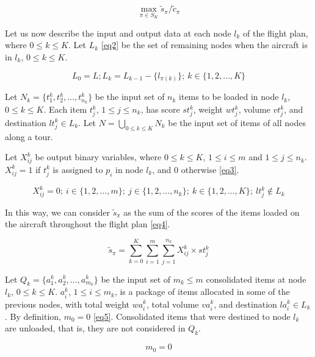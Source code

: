 \documentclass[preprint]{elsarticle}
\begin{document}
\begin{equation} \label{eq1}
	\max_{\pi \in S_K} \tilde{s}_\pi/\tilde{c}_\pi
\end{equation}

Let us now describe the input and output data at each node $l_k$\/ of the flight plan, where $0 \leq k \leq K$. Let $L_k$ \ref{eq2} be the set of remaining nodes when the aircraft is in $l_k$, $0 \leq k \leq K$.

\begin{equation} \label{eq2}
	L_0 = L; L_{k} = L_{k-1} - \{l_{\pi(k)}\}; \ k \in \{1, 2, \ldots, K\}
\end{equation}

Let $N_k = \{t^k_1, t^k_2, \ldots, t^k_{n_k} \}$ be the input set of $n_k$\/ items to be loaded in node $l_k$, $0 \leq k \leq K$. Each item $t^k_j$, $1 \leq j \leq n_k$, has score $st^k_j$, weight $wt^k_j$, volume $vt^k_j$, and destination $lt^k_j \in L_k$. Let $N = \bigcup_{0 \leq k \leq K} N_k$\/ be the input set of items of all nodes along a tour.

Let $X_{ij}^k$\/ be output binary variables, where $0 \leq k \leq K$, $1 \leq i \leq m$\/ and $1 \leq j \leq n_k$. $X_{ij}^k = 1$\/ if $t_j^k$\/ is assigned to $p_i$\/ in node $l_k$, and 0 otherwise \ref{eq3}. 

\begin{equation} \label{eq3}
	X_{ij}^k = 0;  \ i \in \{1, 2, \ldots, m\}; \ j \in \{1, 2, \ldots, n_k\}; \ k \in \{1,2, \ldots, K\}; \ lt_j^k \notin L_k
\end{equation}

In this way, we can consider $\tilde{s}_\pi$ as the sum of the scores of the items loaded on the aircraft throughout the flight plan \ref{eq4}.

\begin{equation} \label{eq4}
	\tilde{s}_\pi = \sum_{k=0}^{K} \sum_{i=1}^{m} \sum_{j=1}^{n_k} X_{ij}^k \times st_j^k
\end{equation}

Let $Q_k = \{a^k_1, a^k_2, \ldots, a^k_{m_k} \}$\/ be the input set of $m_k \leq m$\/ consolidated items at node $l_k$, $0 \leq k \leq K$. $a^k_i$, $1 \leq i \leq m_k$, is a package of items allocated in some of the previous nodes, with total weight $wa^k_i$, total volume $va^k_i$, and destination $la^k_i \in L_k$. By definition, $m_0=0$ \ref{eq5}. Consolidated items that were destined to node $l_k$\/ are unloaded, that is, they are not considered in $Q_k$.

\begin{equation} \label{eq5}
	m_0 = 0
\end{equation}
\end{document}
